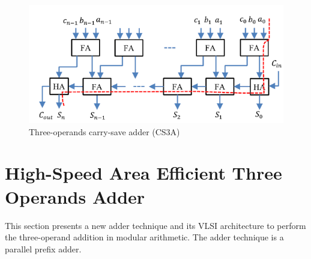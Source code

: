 \begin{figure}[htb]
	\centering
	\includegraphics[width=0.80\columnwidth]{Figures/x3}	
	\caption{Three-operands carry-save adder (CS3A)}
	\label{fig:x3}
\end{figure}


\section{High-Speed Area Efficient Three Operands Adder}
This section presents a new adder technique and its VLSI architecture to perform the three-operand addition in modular arithmetic. The  adder technique is a parallel prefix adder.
